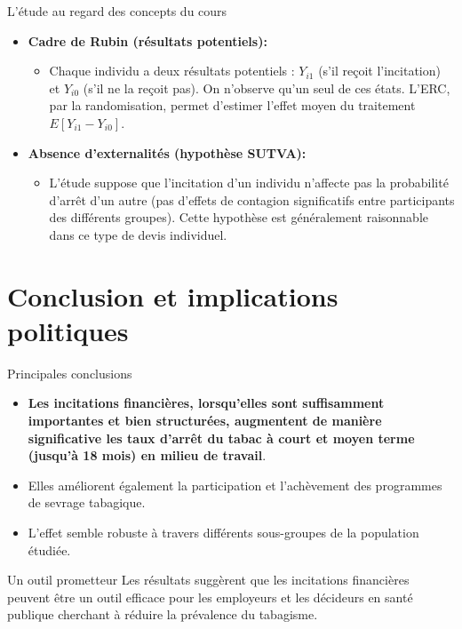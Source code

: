 \documentclass[aspectratio=169,xcolor=dvipsnames]{beamer}
\begin{document}
\begin{frame}{L'étude au regard des concepts du cours}
\begin{itemize}
        \item \textbf{Cadre de Rubin (résultats potentiels):}
            \begin{itemize}
                \item Chaque individu a deux résultats potentiels : $Y_{i1}$ (s'il reçoit l'incitation) et $Y_{i0}$ (s'il ne la reçoit pas). On n'observe qu'un seul de ces états. L'ERC, par la randomisation, permet d'estimer l'effet moyen du traitement $E[Y_{i1} - Y_{i0}]$.
            \end{itemize}
        \item \textbf{Absence d'externalités (hypothèse SUTVA):}
            \begin{itemize}
                \item L'étude suppose que l'incitation d'un individu n'affecte pas la probabilité d'arrêt d'un autre (pas d'effets de contagion significatifs entre participants des différents groupes). Cette hypothèse est généralement raisonnable dans ce type de devis individuel.
            \end{itemize}
    \end{itemize}
\end{frame}

\section{Conclusion et implications politiques}

\begin{frame}{Principales conclusions}
    \begin{itemize}
        \item \textbf{Les incitations financières, lorsqu'elles sont suffisamment importantes et bien structurées, augmentent de manière significative les taux d'arrêt du tabac à court et moyen terme (jusqu'à 18 mois) en milieu de travail}.
        \item Elles améliorent également la participation et l'achèvement des programmes de sevrage tabagique.
        \item L'effet semble robuste à travers différents sous-groupes de la population étudiée.
    \end{itemize}
    \begin{alertblock}{Un outil prometteur}
        Les résultats suggèrent que les incitations financières peuvent être un outil efficace pour les employeurs et les décideurs en santé publique cherchant à réduire la prévalence du tabagisme.
    \end{alertblock}
\end{frame}
\end{document}
